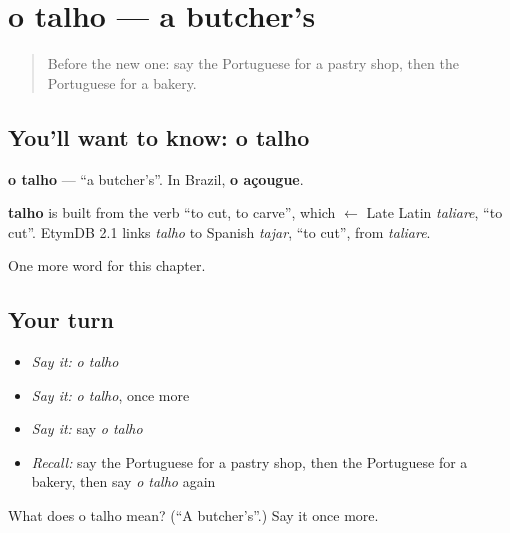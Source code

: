 \section[o talho]{o talho — a butcher's}

\label{lesson:PT-C90-talho}



\begin{quote}
Before the new one: say the Portuguese for a pastry shop, then the Portuguese for a bakery.
\end{quote}

\subsection*{You'll want to know: o talho}
\textbf{o talho} — \textquotedblleft{}a butcher's\textquotedblright{}. In Brazil, \textbf{o açougue}.

\begin{cousinweb}
\textbf{talho} is built from the verb \textquotedblleft{}to cut, to carve\textquotedblright{}, which $\leftarrow$ Late Latin \emph{taliare}, \textquotedblleft{}to cut\textquotedblright{}. EtymDB 2.1 links \emph{talho} to Spanish \emph{tajar}, \textquotedblleft{}to cut\textquotedblright{}, from \emph{taliare}.
\end{cousinweb}

\begin{grammarlens}[title={What you've built}]
One more word for this chapter.
\end{grammarlens}

\subsection*{Your turn}
\begin{itemize}
\raggedright
  \item \emph{Say it:} \emph{o talho}
  \item \emph{Say it:} \emph{o talho}, once more
  \item \emph{Say it:} say \emph{o talho}
  \item \emph{Recall:} say the Portuguese for a pastry shop, then the Portuguese for a bakery, then say \emph{o talho} again
\end{itemize}

\begin{tcolorbox}[breakable,colback=teal!4,colframe=teal!35!black,title={Before you move on}]
What does o talho mean? (\textquotedblleft{}A butcher's\textquotedblright{}.) Say it once more.
\end{tcolorbox}
